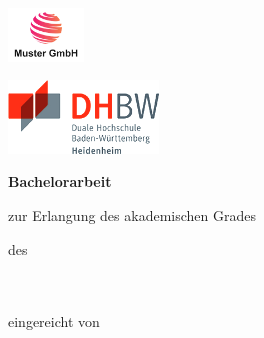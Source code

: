 \begin{titlepage}
    \noindent
    \begin{minipage}{0.45\textwidth}
        \includegraphics[width=2cm]{deckblatt/logos/company_logo.png}
    \end{minipage}
    \hfill
    \begin{minipage}{0.45\textwidth}
        \raggedleft
        \includegraphics[width=4cm]{deckblatt/logos/dhbw_logo.png}
    \end{minipage}

    \centering
    \vspace*{1.5cm}

    {\LARGE\bfseries \projecttitle \par}

    \vspace{1.0cm}
    {\large\bfseries Bachelorarbeit\par}

    \vspace{0.5cm}
    {\normalsize zur Erlangung des akademischen Grades\\[0.1cm]
    \textbf{\degree}}

    \vspace{0.5cm}
    {\normalsize des \degreeprogram\\
    \faculty\\
    \university\\
    \universitycity\par}
    
    \vspace{0.5cm}
    {\normalsize eingereicht von\\[0.1cm]
    \textbf{\studentname} \\
    \textbf{\studentaddress} \\
    \textbf{\studentcity} \\
    }

    \vfill


\end{titlepage}
